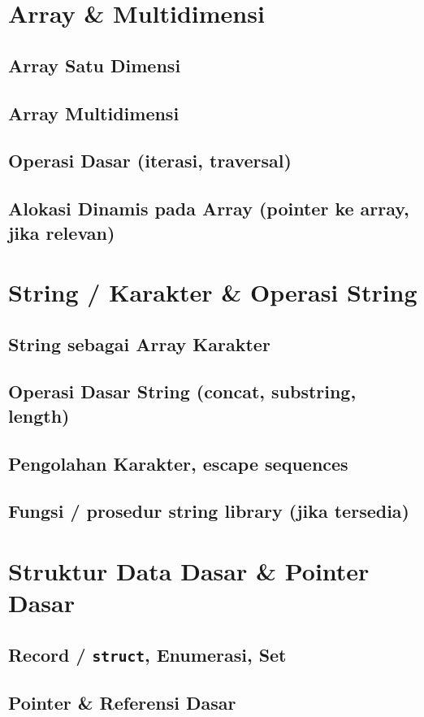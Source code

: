 \documentclass[12pt,a4paper]{book}
\begin{document}
\chapter{Array \& Multidimensi}
\section{Array Satu Dimensi}
\section{Array Multidimensi}
\section{Operasi Dasar (iterasi, traversal)}
\section{Alokasi Dinamis pada Array (pointer ke array, jika relevan)}

\chapter{String / Karakter \& Operasi String}
\section{String sebagai Array Karakter}
\section{Operasi Dasar String (concat, substring, length)}
\section{Pengolahan Karakter, escape sequences}
\section{Fungsi / prosedur string library (jika tersedia)}

\chapter{Struktur Data Dasar \& Pointer Dasar}
\section{Record / \texttt{struct}, Enumerasi, Set}
\section{Pointer & Referensi Dasar}
\end{document}
